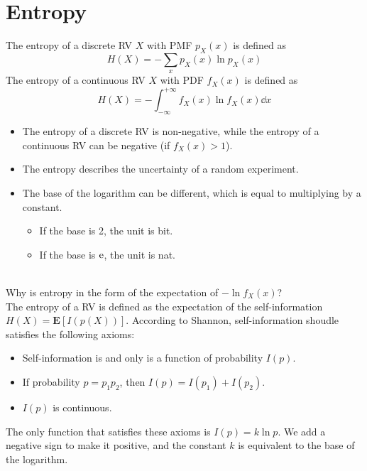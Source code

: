 \documentclass[device=normal, lang=en]{elegantbook}
\numberwithin{equation}{section}
\begin{document}
\section{Entropy}
\begin{definition}[Entropy]
    The entropy of a discrete RV $X$ with PMF $p_X(x)$ is defined as
    \begin{equation}
        H(X) = -\sum_{x} p_X(x) \ln p_X(x)
    \end{equation}
    The entropy of a continuous RV $X$ with PDF $f_X(x)$ is defined as
    \begin{equation}
        H(X) = -\int_{-\infty}^{+\infty} f_X(x) \ln f_X(x) \dd{x}
    \end{equation}
\end{definition}
\begin{remark}
    \begin{itemize}
        \item The entropy of a discrete RV is non-negative, while the entropy of a continuous RV can be negative (if $f_{X}(x) > 1$).
        \item The entropy describes the uncertainty of a random experiment.
        \item The base of the logarithm can be different, which is equal to multiplying by a constant. \begin{itemize}
            \item If the base is 2, the unit is bit.
            \item If the base is $\mathrm{e}$, the unit is nat.
        \end{itemize}
    \end{itemize}
\end{remark}
\begin{remark} \\ 
    Why is entropy in the form of the expectation of $-\ln f_{X}(x)$? \\ 
    The entropy of a RV is defined as the expectation of the self-information $H(X) = \mathbf{E}[I(p(X))]$. According to Shannon, self-information shoudle satisfies the following axioms:
    \begin{itemize}
        \item Self-information is and only is a function of probability $I(p)$.
        \item If probability $p = p_1 p_2$, then $I(p) = I(p_1) + I(p_2)$.
        \item $I(p)$ is continuous.
    \end{itemize}
    The only function that satisfies these axioms is $I(p) = k \ln p$. We add a negative sign to make it positive, and the constant $k$ is equivalent to the base of the logarithm. 
\end{remark}
\end{document}
